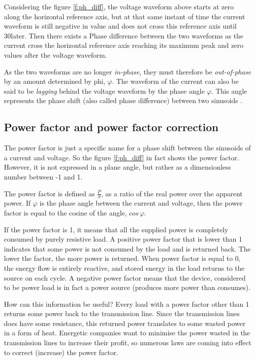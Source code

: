 \documentclass[journal]{IEEEtran}
\begin{document}
Considering the figure \ref{f:ph_diff}, the voltage waveform above starts at zero along the horizontal reference axis, but at that same instant of time the current waveform is still negative in value and does not cross this reference axis until 30\degree  later. Then there exists a Phase difference between the two waveforms as the current cross the horizontal reference axis reaching its maximum peak and zero values after the voltage waveform.

As the two waveforms are no longer \textit{in-phase}, they must therefore be \textit{out-of-phase} by an amount determined by phi, $\varphi$. The waveform of the current can also be said to be \textit{lagging} behind the voltage waveform by the phase angle $\varphi$. This angle represents the phase shift (also called phase difference) between two sinusoids \cite{maxfield2011electrical}.


\subsection{Power factor and power factor correction}
The power factor is just a specific name for a phase shift between the sinusoids of a current and voltage. So the figure \ref{f:ph_diff} in fact shows the power factor. However, it is not expressed in a plane angle, but rather as a dimensionless number between -1 and 1.

The power factor is defined as $\frac{P}{S}$, as a ratio of the real power over the apparent power\cite{dixit2010electrical}. If $\varphi$ is the phase angle between the current and voltage, then the power factor is equal to the cosine of the angle, $cos\,\varphi$.

If the power factor is 1, it means that all the supplied power is completely consumed by purely resistive load. A positive power factor that is lower than 1 indicates that some power is not consumed by the load and is returned back. The lower the factor, the more power is returned. When power factor is equal to 0, the energy flow is entirely reactive, and stored energy in the load returns to the source on each cycle. A negative power factor means that the device, considered to be power load is in fact a power source (produces more power than consumes).

How can this information be useful? Every load with a power factor other than 1 returns some power back to the transmission line. Since the transmission lines does have some resistance, this returned power translates to some wasted power in a form of heat. Energetic companies want to minimise the power wasted in the transmission lines to increase their profit, so numerous laws are coming into effect to correct \cite{singh2008electric} (increase) the power factor.
\end{document}
